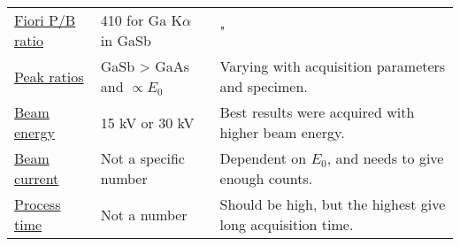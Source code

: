 \begin{table}[phtb]
\begin{center}
\begin{tabular}{p{2.5cm}p{4cm}p{7cm}}
            \hyperref[results:fiori]{Fiori P/B ratio}                     & 410 for Ga K$\alpha$ in GaSb  & "                                                                                                                                                                                                      \\
            \hyperref[results:peak_ratios]{Peak ratios}                   & GaSb > GaAs and $\propto E_0$ & Varying with acquisition parameters and specimen.                                                                                                                                                      \\
            \hline%
            \hyperref[results:beam_energy_and_beam_current]{Beam energy}  & 15 kV or 30 kV                & Best results were acquired with higher beam energy.                                                                                                                                                    \\
            \hyperref[results:beam_energy_and_beam_current]{Beam current} & Not a specific number         & Dependent on $E_0$, and needs to give enough counts.                                                                                                                                                   \\
            \hyperref[results:process_time]{Process time}                 & Not a number                  & Should be high, but the highest give long acquisition time.                                                                                                                                            \\
            \hline
        \end{tabular}
    \end{center}
\end{table}
